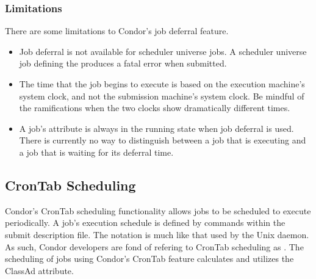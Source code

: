 \subsubsection{Limitations}
\label{sec:JobDeferral-Limitations}
There are some limitations to Condor's job deferral feature.

\begin{itemize}
\item Job deferral is not available for scheduler universe jobs.
A scheduler universe job defining the 
produces a fatal error when submitted.

\item The time that the job begins to execute 
is based on the execution machine's system clock, 
and not the submission machine's system clock. 
Be mindful of the ramifications when
the two clocks show dramatically different times.

\item A job's  attribute is always in the running state 
when job deferral is used. 
There is currently no way to distinguish between a job that is 
executing and a job that is waiting for its deferral time. 

\end{itemize}

\subsection{CronTab Scheduling}
\label{sec:CronTab}

Condor's CronTab scheduling functionality allows jobs to be 
scheduled to execute periodically. 
A job's execution schedule is defined by commands within
the submit description file.
The notation is much like that used by the Unix  daemon. 
As such, Condor developers are fond of refering to CronTab
scheduling as .
The scheduling of jobs using Condor's CronTab feature 
calculates and utilizes
the  ClassAd attribute. 

